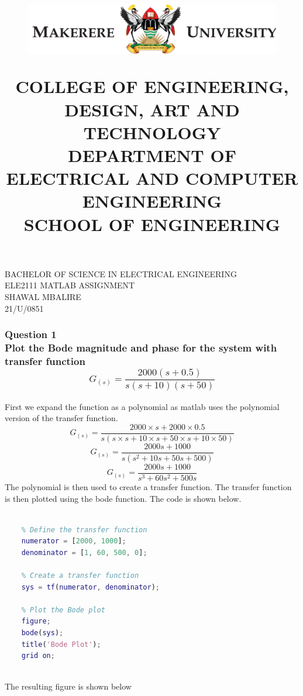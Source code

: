 \documentclass[a4paper,12pt]{article}
\title{

    \begin{figure}[H]
    \centering
    \includegraphics{../../mak_logo.png}
    \end{figure}
    \textbf {COLLEGE OF ENGINEERING, DESIGN, ART AND TECHNOLOGY\\
    DEPARTMENT OF ELECTRICAL AND COMPUTER ENGINEERING\\
    SCHOOL OF ENGINEERING}\\

}
\begin{document}
\maketitle

\vfil
\begin{center}
BACHELOR OF SCIENCE IN ELECTRICAL ENGINEERING\\[20pt]
ELE2111 MATLAB ASSIGNMENT\\[20pt]

SHAWAL MBALIRE\\
21/U/0851 \\
\end{center}
\newpage




\subsubsection*{Question 1\\
Plot the Bode magnitude and phase for the system with transfer function \[ G_{(s)} = \frac{2000(s + 0.5)} {s(s + 10)(s + 50)}\]}

First we expand the function as a polynomial as matlab uses the polynomial version of the transfer function. 
\[ G_{(s)} = \frac{2000\times s + 2000\times0.5} {s(s\times s + 10\times s + 50\times s + 10\times50)}\]
\[ G_{(s)} = \frac{2000s + 1000} {s(s^2 + 10s + 50s + 500)}\]
\[ G_{(s)} = \frac{2000s + 1000} {s^3 + 60s^2 + 500s}\]
The polynomial is then used to create a transfer function. The transfer function is then plotted using the bode function. The code is shown below.

\begin{lstlisting}[language=Matlab]

    % Define the transfer function
    numerator = [2000, 1000];
    denominator = [1, 60, 500, 0];
    
    % Create a transfer function
    sys = tf(numerator, denominator);
    
    % Plot the Bode plot
    figure;
    bode(sys);
    title('Bode Plot');
    grid on;
  

\end{lstlisting}

The resulting figure is shown below
\end{document}
